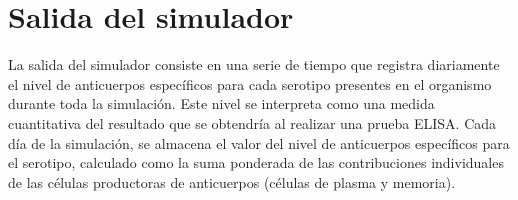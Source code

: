 \section{Salida del simulador}
La salida del simulador consiste en una serie de tiempo que registra diariamente el nivel de anticuerpos específicos para cada serotipo presentes en el organismo durante toda la simulación. Este nivel se interpreta como una medida cuantitativa del resultado que se obtendría al realizar una prueba ELISA.
Cada día de la simulación, se almacena el valor del nivel de anticuerpos específicos para el serotipo, calculado como la suma ponderada de las contribuciones individuales de las células productoras de anticuerpos (células de plasma y memoria).
     





